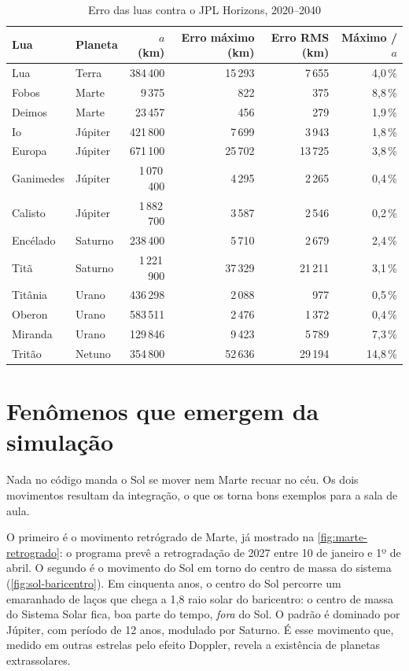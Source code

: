 \begin{table}[htb]
  \centering
  \caption{Erro das luas contra o JPL Horizons, 2020--2040}
  \label{tab:luas}
  \small
  \begin{tabular}{llrrrr}
    \toprule
    Lua & Planeta & $a$ (km) & Erro máximo (km) & Erro RMS (km) & Máximo / $a$ \\
    \midrule
    Lua      & Terra   & 384\,400   & 15\,293 & 7\,655  & 4,0\,\% \\
    Fobos    & Marte   & 9\,375     & 822     & 375     & 8,8\,\% \\
    Deimos   & Marte   & 23\,457    & 456     & 279     & 1,9\,\% \\
    Io       & Júpiter & 421\,800   & 7\,699  & 3\,943  & 1,8\,\% \\
    Europa   & Júpiter & 671\,100   & 25\,702 & 13\,725 & 3,8\,\% \\
    Ganimedes& Júpiter & 1\,070\,400 & 4\,295 & 2\,265  & 0,4\,\% \\
    Calisto  & Júpiter & 1\,882\,700 & 3\,587 & 2\,546  & 0,2\,\% \\
    Encélado & Saturno & 238\,400   & 5\,710  & 2\,679  & 2,4\,\% \\
    Titã     & Saturno & 1\,221\,900 & 37\,329 & 21\,211 & 3,1\,\% \\
    Titânia  & Urano   & 436\,298   & 2\,088  & 977     & 0,5\,\% \\
    Oberon   & Urano   & 583\,511   & 2\,476  & 1\,372  & 0,4\,\% \\
    Miranda  & Urano   & 129\,846   & 9\,423  & 5\,789  & 7,3\,\% \\
    Tritão   & Netuno  & 354\,800   & 52\,636 & 29\,194 & 14,8\,\% \\
    \bottomrule
  \end{tabular}
\end{table}

\section{Fenômenos que emergem da simulação}

Nada no código manda o Sol se mover nem Marte recuar no céu. Os dois movimentos resultam da integração, o que os torna bons exemplos para a sala de aula.

O primeiro é o movimento retrógrado de Marte, já mostrado na \autoref{fig:marte-retrogrado}: o programa prevê a retrogradação de 2027 entre 10 de janeiro e 1º de abril. O segundo é o movimento do Sol em torno do centro de massa do sistema (\autoref{fig:sol-baricentro}). Em cinquenta anos, o centro do Sol percorre um emaranhado de laços que chega a 1,8 raio solar do baricentro: o centro de massa do Sistema Solar fica, boa parte do tempo, \emph{fora} do Sol. O padrão é dominado por Júpiter, com período de 12 anos, modulado por Saturno. É esse movimento que, medido em outras estrelas pelo efeito Doppler, revela a existência de planetas extrassolares.

